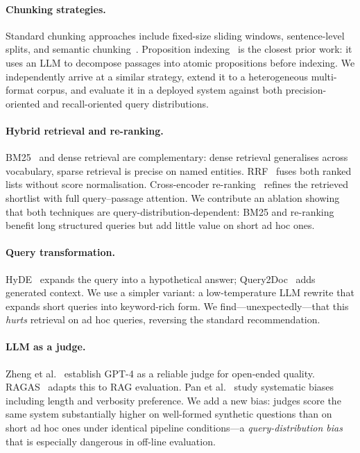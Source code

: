 \documentclass[sigconf,natbib=true]{acmart}
\begin{document}
\paragraph{Chunking strategies.}
Standard chunking approaches include fixed-size sliding windows, sentence-level splits, and semantic chunking~\cite{shi2023chunking}.
Proposition indexing~\cite{chen2023densex} is the closest prior work: it uses an LLM to decompose passages into atomic propositions before indexing.
We independently arrive at a similar strategy, extend it to a heterogeneous multi-format corpus, and evaluate it in a deployed system against both precision-oriented and recall-oriented query distributions.

\paragraph{Hybrid retrieval and re-ranking.}
BM25~\cite{robertson2009bm25} and dense retrieval are complementary: dense retrieval generalises across vocabulary, sparse retrieval is precise on named entities.
RRF~\cite{cormack2009rrf} fuses both ranked lists without score normalisation.
Cross-encoder re-ranking~\cite{nogueira2019passage} refines the retrieved shortlist with full query--passage attention.
We contribute an ablation showing that both techniques are query-distribution-dependent: BM25 and re-ranking benefit long structured queries but add little value on short ad hoc ones.

\paragraph{Query transformation.}
HyDE~\cite{gao2023hyde} expands the query into a hypothetical answer; Query2Doc~\cite{wang2023query2doc} adds generated context.
We use a simpler variant: a low-temperature LLM rewrite that expands short queries into keyword-rich form.
We find---unexpectedly---that this \emph{hurts} retrieval on ad hoc queries, reversing the standard recommendation.

\paragraph{LLM as a judge.}
Zheng et al.~\cite{zheng2023judging} establish GPT-4 as a reliable judge for open-ended quality.
RAGAS~\cite{es2023ragas} adapts this to RAG evaluation.
Pan et al.~\cite{pan2024llmjudge} study systematic biases including length and verbosity preference.
We add a new bias: judges score the same system substantially higher on well-formed synthetic questions than on short ad hoc ones under identical pipeline conditions---a \emph{query-distribution bias} that is especially dangerous in off-line evaluation.
\end{document}
